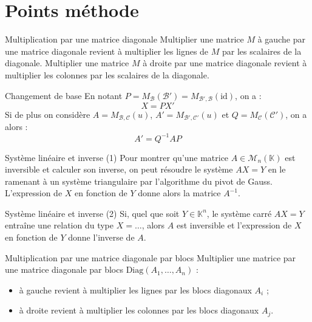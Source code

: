 \documentclass[french]{book}
\newcommand{\K}{\mathbb{K}}
\newcommand{\inv}{^{-1}}
\theoremstyle{plain}
\theoremstyle{definition}
\theoremstyle{remark}
\begin{document}
\section{Points méthode}
\begin{PM}{Multiplication par une matrice diagonale} Multiplier une matrice $M$ à gauche par une matrice diagonale revient à multiplier les lignes de $M$ par les scalaires de la diagonale. Multiplier une matrice $M$ à droite par une matrice diagonale revient à multiplier les colonnes par les scalaires de la diagonale.
\end{PM}
\begin{PM}{Changement de base} En notant $P=M_\mathcal{B}(\mathcal{B}')=M_{\mathcal{B'},\mathcal{B}}(\text{id})$, on a : $$X=PX'$$ Si de plus on considère $A=M_{\mathcal{B},\mathcal{C}}(u)$, $A'=M_{\mathcal{B'},\mathcal{C'}}(u)$ et $Q=M_\mathcal{C}(\mathcal{C}')$, on a alors : $$A'=Q\inv AP$$
\end{PM}
\begin{PM}{Système linéaire et inverse (1)} Pour montrer qu'une matrice $A\in\mathcal{M}_n(\K)$ est inversible et calculer son inverse, on peut résoudre le système $AX=Y$ en le ramenant à un système triangulaire par l'algorithme du pivot de Gauss. L'expression de $X$ en fonction de $Y$ donne alors la matrice $A\inv$.
\end{PM}
\begin{PM}{Système linéaire et inverse (2)} Si, quel que soit $Y\in\K^n$, le système carré $AX=Y$ entraîne une relation du type $X=\ldots$, alors $A$ est inversible et l'expression de $X$ en fonction de $Y$ donne l'inverse de $A$.
\end{PM}
\begin{PM}{Multiplication par une matrice diagonale par blocs} Multiplier une matrice par une matrice diagonale par blocs $\text{Diag}(A_1,\ldots,A_n)$ :
\begin{itemize}
	\item à gauche revient à multiplier les lignes par les blocs diagonaux $A_i$ ;
	\item à droite revient à multiplier les colonnes par les blocs diagonaux $A_j$.
\end{itemize}
\end{PM}
\end{document}
